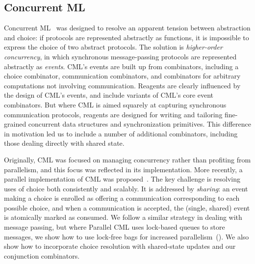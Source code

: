 \documentclass[preprint,nocopyrightspace]{sigplanconf}
\begin{document}
\subsection{Concurrent ML}

Concurrent ML~\cite{Reppy1991} was designed to resolve an apparent tension
between abstraction and choice: if protocols are represented abstractly as
functions, it is impossible to express the choice of two abstract protocols.
The solution is \emph{higher-order concurrency}, in which synchronous
message-passing protocols are represented abstractly as \emph{events}.  CML's
events are built up from combinators, including a choice combinator,
communication combinators, and combinators for arbitrary computations not
involving communication.  
Reagents are clearly influenced by the design of CML's events, and include
variants of CML's core event combinators.
But where CML is aimed squarely at capturing synchronous communication
protocols, reagents are designed for writing and tailoring fine-grained
concurrent data structures and synchronization primitives.  This difference in
motivation led us to include a number of additional combinators, including
those dealing directly with shared state.

Originally, CML was focused on managing concurrency rather than profiting from
parallelism, and this focus was reflected in its implementation.  More
recently, a parallel implementation of CML was proposed~\cite{Reppy2009}.  The
key challenge is resolving uses of choice both consistently and scalably.  It
is addressed by \emph{sharing}: an event making a choice is enrolled as
offering a communication corresponding to each possible choice, and when a
communication is accepted, the (single, shared) event is atomically marked as
consumed.  We follow a similar strategy in dealing with message passing, but
where Parallel CML uses lock-based queues to store messages, we show how to
use lock-free bags for increased parallelism~().  We
also show how to incorporate choice resolution with shared-state updates and
our conjunction combinators.

\end{document}
